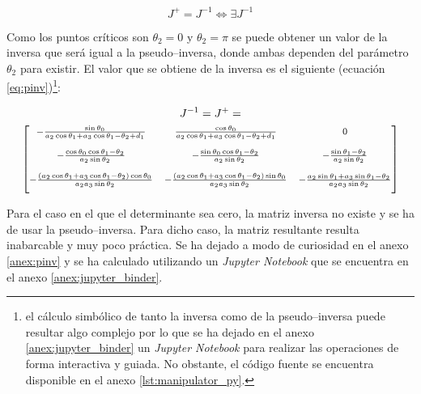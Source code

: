 \begin{equation*}
    J^+ = J^{-1} \iff \exists J^{-1}
\end{equation*}

Como los puntos críticos son $\theta_2 = 0$ y $\theta_2 = \pi$ se puede obtener un valor
de la inversa que será igual a la pseudo--inversa, donde ambas dependen del parámetro
$\theta_2$ para existir. El valor que se obtiene de la inversa es el siguiente (ecuación
\ref{eq:pinv})\footnote{el cálculo simbólico de tanto la inversa como de la pseudo--inversa
    puede resultar algo complejo por lo que se ha dejado en el anexo \ref{anex:jupyter_binder}
    un \textit{Jupyter Notebook} para realizar las operaciones de forma interactiva y guiada.
    No obstante, el código fuente se encuentra disponible en el anexo \ref{lst:manipulator_py}.}:

\begin{gather}\label{eq:pinv}
    J^{-1} = J^+ = \\
    {\footnotesize\begin{bmatrix}
        - \frac{\sin{\theta_{0}}}{a_{2} \cos{\theta_{1}} + a_{3} \cos{\theta_{1} - \theta_{2}} + d_{1}}                                   & \frac{\cos{\theta_{0}}}{a_{2} \cos{\theta_{1}} + a_{3} \cos{\theta_{1} - \theta_{2}} + d_{1}}                                     & 0                                                                                                   \\[3ex]
        - \frac{\cos{\theta_{0}} \cos{\theta_{1} - \theta_{2}}}{a_{2} \sin{\theta_{2}}}                                                   & - \frac{\sin{\theta_{0}} \cos{\theta_{1} - \theta_{2}}}{a_{2} \sin{\theta_{2}}}                                                   & - \frac{\sin{\theta_{1} - \theta_{2}}}{a_{2} \sin{\theta_{2}}}                                      \\[3ex]
        - \frac{\left(a_{2} \cos{\theta_{1}} + a_{3} \cos{\theta_{1} - \theta_{2}}\right) \cos{\theta_{0}}}{a_{2} a_{3} \sin{\theta_{2}}} & - \frac{\left(a_{2} \cos{\theta_{1}} + a_{3} \cos{\theta_{1} - \theta_{2}}\right) \sin{\theta_{0}}}{a_{2} a_{3} \sin{\theta_{2}}} & - \frac{a_{2} \sin{\theta_{1}} + a_{3} \sin{\theta_{1} - \theta_{2}}}{a_{2} a_{3} \sin{\theta_{2}}} \\[2ex]
    \end{bmatrix}} \nonumber
\end{gather}

Para el caso en el que el determinante sea cero, la matriz inversa no existe y se
ha de usar la pseudo--inversa. Para dicho caso, la matriz resultante resulta inabarcable
y muy poco práctica. Se ha dejado a modo de curiosidad en el anexo \ref{anex:pinv} y se ha
calculado utilizando un \textit{Jupyter Notebook} que se encuentra en el anexo
\ref{anex:jupyter_binder}.